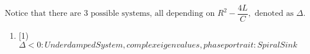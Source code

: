 \documentclass[preview]{standalone}
\begin{document}
\begin{center}
\[\text{Notice that there are 3 possible systems, all depending on } 
                    R^2 - \frac{4L}{C}, \text{ denoted as } \Delta.\]
                    \begin{enumerate}
                        \item[1) $\Delta < 0: Underdamped System, complex eigenvalues, phase portrait: Spiral Sink$
                    \end{enumerate}
\end{center}
\end{document}
